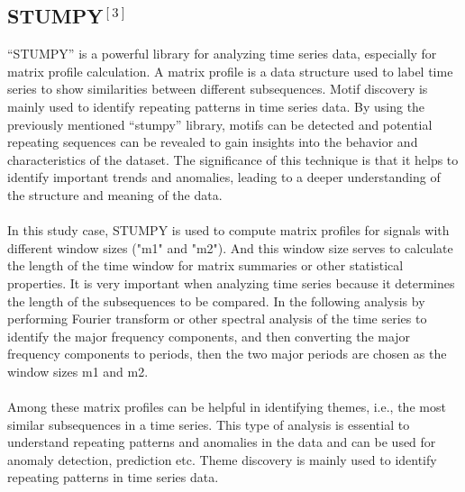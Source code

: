 \documentclass[]{iat}
\begin{document}
\subsection{STUMPY$^{[3]}$}
“STUMPY” is a powerful library for analyzing time series data, especially for matrix profile calculation. A matrix profile is a data structure used to label time series to show similarities between different subsequences. Motif discovery is mainly used to identify repeating patterns in time series data. By using the previously mentioned “stumpy” library, motifs can be detected and potential repeating sequences can be revealed to gain insights into the behavior and characteristics of the dataset. The significance of this technique is that it helps to identify important trends and anomalies, leading to a deeper understanding of the structure and meaning of the data. \\
\\
In this study case, STUMPY is used to compute matrix profiles for signals with different window sizes ("m1" and "m2"). And this window size serves to calculate the length of the time window for matrix summaries or other statistical properties. It is very important when analyzing time series because it determines the length of the subsequences to be compared. In the following analysis by performing Fourier transform or other spectral analysis of the time series to identify the major frequency components, and then converting the major frequency components to periods, then the two major periods are chosen as the window sizes m1 and m2.\\
\\
Among these matrix profiles can be helpful in identifying themes, i.e., the most similar subsequences in a time series. This type of analysis is essential to understand repeating patterns and anomalies in the data and can be used for anomaly detection, prediction etc. Theme discovery is mainly used to identify repeating patterns in time series data.
\end{document}
